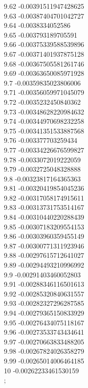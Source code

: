 {9.62	-0.00391511947428625\\
9.63	-0.00387404701042727\\
9.64	-0.0038334052586\\
9.65	-0.003793189705591\\
9.66	-0.00375339588539896\\
9.67	-0.00371401937875128\\
9.68	-0.00367505581261746\\
9.69	-0.00363650085971928\\
9.7	-0.00359835023806006\\
9.71	-0.00356059971045079\\
9.72	-0.0035232450840362\\
9.73	-0.00348628220984632\\
9.74	-0.00344970698232258\\
9.75	-0.00341351533887568\\
9.76	-0.003377703259434\\
9.77	-0.00334226676599827\\
9.78	-0.0033072019222059\\
9.79	-0.0032725048328888\\
9.8	-0.00323817164365363\\
9.81	-0.00320419854045236\\
9.82	-0.00317058174915611\\
9.83	-0.00313731753514167\\
9.84	-0.00310440220288439\\
9.85	-0.00307183209554153\\
9.86	-0.00303960359455149\\
9.87	-0.00300771311923946\\
9.88	-0.00297615712641027\\
9.89	-0.00294493210996992\\
9.9	-0.00291403460052803\\
9.91	-0.00288346116501613\\
9.92	-0.00285320840631557\\
9.93	-0.00282327296287585\\
9.94	-0.00279365150833929\\
9.95	-0.00276434075118167\\
9.96	-0.00273533743434641\\
9.97	-0.00270663833488205\\
9.98	-0.00267824026358279\\
9.99	-0.00265014006464185\\
10	-0.00262233461530159\\
};
